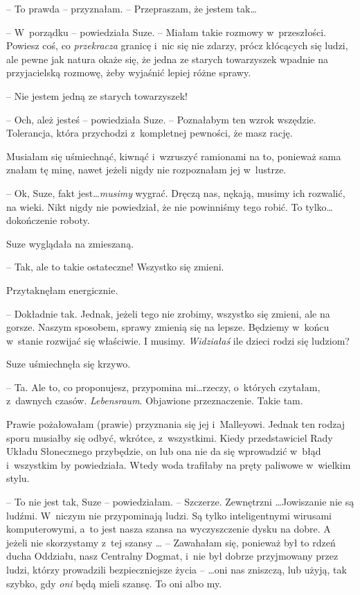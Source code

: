 \documentclass[oneside,polish,11pt,sfheadings]{mwbk}
\begin{document}
-- To prawda -- przyznałam. -- Przepraszam, że jestem tak\ldots 

-- W~porządku -- powiedziała Suze. -- Miałam takie rozmowy w~przeszłości.
Powiesz coś, co \textit{przekracza} granicę i~nic się nie zdarzy, prócz
kłócących się ludzi, ale pewne jak natura okaże się, że jedna ze starych
towarzyszek wpadnie na przyjacielską rozmowę, żeby wyjaśnić lepiej różne
sprawy.

-- Nie jestem jedną ze starych towarzyszek!

-- Och, ależ jesteś -- powiedziała Suze. -- Poznałabym ten wzrok wszędzie.
Tolerancja, która przychodzi z~kompletnej pewności, że masz rację.

Musiałam się uśmiechnąć, kiwnąć i~wzruszyć ramionami na to, ponieważ
sama znałam tę minę, nawet jeżeli nigdy nie rozpoznałam jej w~lustrze.

-- Ok, Suze, fakt jest\ldots  \textit{musimy} wygrać. Dręczą nas, nękają,
musimy ich rozwalić, na wieki. Nikt nigdy nie powiedział, że nie
powinniśmy tego robić. To tylko\ldots  dokończenie roboty.

Suze wyglądała na zmieszaną. 

-- Tak, ale to takie ostateczne! Wszystko
się zmieni.

Przytaknęłam energicznie. 

-- Dokładnie tak. Jednak, jeżeli tego nie
zrobimy, wszystko się zmieni, ale na gorsze. Naszym sposobem, sprawy
zmienią się na lepsze. Będziemy w~końcu w~stanie rozwijać się właściwie.
I musimy. \textit{Widziałaś} ile dzieci rodzi się ludziom?

Suze uśmiechnęła się krzywo. 

-- Ta. Ale to, co proponujesz, przypomina
mi\ldots  rzeczy, o~których czytałam, z~dawnych czasów. \textit{Lebensraum}.
Objawione przeznaczenie. Takie tam.

Prawie pożałowałam (prawie) przyznania się jej i~Malleyowi. Jednak ten
rodzaj sporu musiałby się odbyć, wkrótce, z~wszystkimi. Kiedy
przedstawiciel Rady Układu Słonecznego przybędzie, on lub ona nie da się
wprowadzić w~błąd i~wszystkim by powiedziała. Wtedy woda trafiłaby na
pręty paliwowe w~wielkim stylu.

-- To nie jest tak, Suze -- powiedziałam. -- Szczerze. Zewnętrzni \ldots Jowiszanie nie są ludźmi. W~niczym nie przypominają ludzi. Są tylko
inteligentnymi wirusami komputerowymi, a~to jest nasza szansa na
wyczyszczenie dysku na dobre. A jeżeli nie skorzystamy z~tej szansy \ldots 
-- Zawahałam się, ponieważ był to rdzeń ducha Oddziału, nasz Centralny
Dogmat, i~nie był dobrze przyjmowany przez ludzi, którzy prowadzili
bezpieczniejsze życia -- \ldots  oni nas zniszczą, lub użyją, tak szybko, gdy
\textit{oni} będą mieli szansę. To oni albo my.
\end{document}
